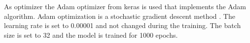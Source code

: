As optimizer the Adam optimizer from keras is used that implements the Adam algorithm. Adam optimization is a stochastic gradient descent method . The learning rate is set to 0.00001 and not changed during the training. The batch size is set to 32 and the model is trained for 1000 epochs. 

